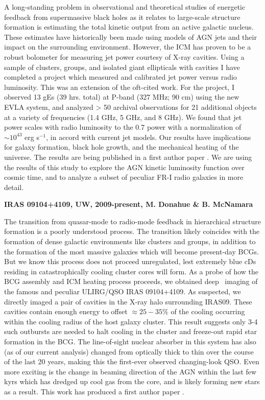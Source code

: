 \documentclass[12pt]{cv}
\begin{document}
A long-standing problem in observational and theoretical studies of
energetic feedback from supermassive black holes as it relates to
large-scale structure formation is estimating the total kinetic output
from an active galactic nucleus. These estimates have historically
been made using models of AGN jets and their impact on the surrounding
environment. However, the ICM has proven to be a robust bolometer for
measuring jet power courtesy of X-ray cavities. Using a sample of
clusters, groups, and isolated giant ellipticals with cavities I have
completed a project which measured and calibrated jet power versus
radio luminosity. This was an extension of the oft-cited
\cite{birzan04, birzan08} work. For the project, I observed 13 gEs (39
hrs. total) at P-band (327 MHz; 90 cm) using the new EVLA system, and
analyzed > 50 archival observations for 21 additional objects at a
variety of frequencies (1.4 GHz, 5 GHz, and 8 GHz). We found that jet
power scales with radio luminosity to the 0.7 power with a
normalization of $\sim 10^{43}$ erg s$^{-1}$, in accord with current
jet models. Our results have implications for galaxy formation, black
hole growth, and the mechanical heating of the universe. The results
are being published in a first author paper \cite{pjet}. We are using
the results of this study to explore the AGN kinetic luminosity
function over cosmic time, and to analyze a subset of peculiar FR-I
radio galaxies in more detail.

{\bfseries{IRAS 09104+4109, UW, 2009-present, M. Donahue \& B. McNamara}}

The transition from quasar-mode to radio-mode feedback in hierarchical
structure formation is a poorly understood process. The transition
likely coincides with the formation of dense galactic environments
like clusters and groups, in addition to the formation of the most
massive galaxies which will become present-day BCGs. But we know this
process does not proceed unregulated, lest extremely blue cDs residing
in catastrophically cooling cluster cores will form. As a probe of how
the BCG assembly and ICM heating process proceeds, we obtained deep
\chandra\ imaging of the famous and peculiar ULIRG/QSO IRAS
09104+4109. As suspected, we directly imaged a pair of cavities in the
X-ray halo surrounding IRAS09. These cavities contain enough energy to
offset $\approx 25-35\%$ of the cooling occurring within the cooling
radius of the host galaxy cluster. This result suggests only 3-4 such
outbursts are needed to halt cooling in the cluster and freeze-out
rapid star formation in the BCG. The line-of-sight nuclear absorber in
this system has also (as of our current analysis) changed from
optically thick to thin over the course of the last 20 years, making
this the first-ever observed changing-look QSO. Even more exciting is
the change in beaming direction of the AGN within the last few kyrs
which has dredged up cool gas from the core, and is likely forming new
stars as a result. This work has produced a first author paper
\cite{iras09}.
\end{document}
